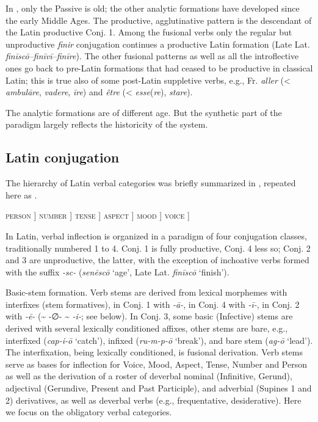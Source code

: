 \documentclass[output=paper, colorlinks,citecolor=brown]{langsci/langscibook}
\begin{document}
In , only the Passive is old; the other analytic formations have developed since the early Middle Ages. The productive, agglutinative pattern is the descendant of the Latin productive Conj. 1. Among the fusional verbs only the regular but unproductive \textit{finir} conjugation continues a productive Latin formation (Late Lat. \textit{finīscō–finīvī–finīre}). The other fusional patterns as well as all the introflective ones go back to pre-Latin formations that had ceased to be productive in classical Latin; this is true also of some post-Latin suppletive verbs, e.g., Fr. \textit{aller} (< \textit{ambulāre}, \textit{vadere}, \textit{īre}) and \textit{être} (< \textit{esse}(\textit{re}), \textit{stare}). 

The analytic formations are of different age. But the synthetic part of the paradigm largely reflects the historicity of the system. 

\subsection{Latin conjugation}  \label{latin_conjugation}

The hierarchy of Latin verbal categories was briefly summarized in , repeated here as .

\begin{exe}
    \ex \label{ex:andersen_6} \textsc{person} ] \textsc{number} ] \textsc{tense} ] \textsc{aspect} ] \textsc{mood} ] \textsc{voice} ]  
\end{exe}

\begin{sloppypar}
In Latin, verbal inflection is organized in a paradigm of four conjugation classes, traditionally numbered 1 to 4. Conj. 1 is fully productive, Conj. 4 less so; Conj. 2 and 3 are unproductive, the latter, with the exception of inchoative verbs formed with the suffix \textit{{}-sc-} (\textit{senēscō} `age', Late Lat. \textit{finīscō} `finish'). 
\end{sloppypar}

Basic-stem formation. Verb stems are derived from lexical morphemes with interfixes (stem formatives),  in Conj. 1 with \textit{-ā-}, in Conj. 4 with \textit{-ī-}, in Conj. 2 with \textit{-ē-} ({\textasciitilde} -∅- {\textasciitilde} \textit{-i-}; see below). In Conj. 3, some basic (Infective) stems are derived with several lexically conditioned affixes, other stems are bare, e.g., interfixed (\textit{cap-i-ō} `catch'), infixed (\textit{ru-m-p-ō} `break'), and bare stem (\textit{ag-ō} `lead'). The interfixation, being lexically conditioned, is fusional derivation. Verb stems serve as bases for inflection for Voice, Mood, Aspect, Tense, Number and Person as well as the derivation of a roster of deverbal nominal (Infinitive, Gerund), adjectival (Gerundive, Present and Past Participle), and adverbial (Supines 1 and 2) derivatives, as well as deverbal verbs (e.g., frequentative, desiderative). Here we focus on the obligatory verbal categories. 
\end{document}
